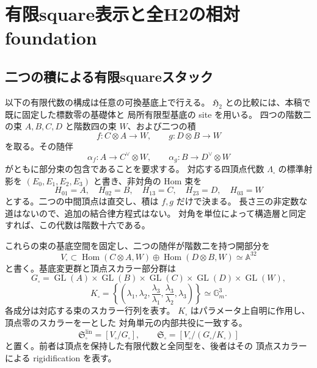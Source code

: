 \section{有限square表示と全H2の相対foundation}
\label{sec:qa-relative-square-foundation-stack}

\subsection{二つの積による有限squareスタック}
\label{subsec:qa-square-normal-foundation-stack}

以下の有限代数の構成は任意の可換基底上で行える。
$\mathfrak H_2$ との比較には、本稿で既に固定した標数零の基礎体と
局所有限型基底の site を用いる。
四つの階数二の束 $A,B,C,D$ と階数四の束 $W$、および二つの積
\[
 f:C\otimes A\longrightarrow W,\qquad
 g:D\otimes B\longrightarrow W
\]
を取る。その随伴
\[
 \alpha_f:A\longrightarrow C^\vee\otimes W,\qquad
 \alpha_g:B\longrightarrow D^\vee\otimes W
\]
がともに部分束の包含であることを要求する。
対応する四頂点代数 $\Lambda_\square$ の標準射影を
$(E_0,E_1,E_2,E_3)$ と書き、非対角の Hom 束を
\[
 H_{01}=A,\quad H_{02}=B,\quad H_{13}=C,\quad
 H_{23}=D,\quad H_{03}=W
\]
とする。二つの中間頂点は直交し、積は $f,g$ だけで決まる。
長さ三の非定数な道はないので、追加の結合律方程式はない。
対角を単位によって構造層と同定すれば、この代数は階数十六である。

これらの束の基底空間を固定し、二つの随伴が階数二を持つ開部分を
\[
 V_\square\subset
 \operatorname{Hom}(C\otimes A,W)
 \oplus\operatorname{Hom}(D\otimes B,W)
 \simeq\mathbb A^{32}
\]
と書く。基底変更群と頂点スカラー部分群は
\[
 G_\square=\operatorname{GL}(A)\times\operatorname{GL}(B)
 \times\operatorname{GL}(C)\times\operatorname{GL}(D)
 \times\operatorname{GL}(W),
\]
\[
 K_\square=
 \left\{\left(\lambda_1,\lambda_2,
 \frac{\lambda_3}{\lambda_1},
 \frac{\lambda_3}{\lambda_2},\lambda_3\right)\right\}
 \simeq\mathbb G_m^3.
\]
各成分は対応する束のスカラー行列を表す。
$K_\square$ はパラメータ上自明に作用し、頂点零のスカラーを一とした
対角単元の内部共役に一致する。
\[
 \mathfrak S^{\mathrm{lin}}_\square=[V_\square/G_\square],\qquad
 \mathfrak S_\square=[V_\square/(G_\square/K_\square)]
\]
と置く。前者は頂点を保持した有限代数と全同型を、後者はその
頂点スカラーによる rigidification を表す。

